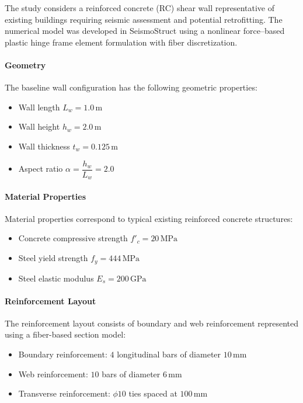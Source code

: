 \documentclass[fleqn,10pt]{wlscirep}
\begin{document}
The study considers a reinforced concrete (RC) shear wall representative of existing buildings requiring seismic assessment and potential retrofitting. 
The numerical model was developed in SeismoStruct using a nonlinear force--based plastic hinge frame element formulation with fiber discretization.

\paragraph{Geometry}

The baseline wall configuration has the following geometric properties:

\begin{itemize}
\item Wall length $L_w = 1.0\,\text{m}$
\item Wall height $h_w = 2.0\,\text{m}$
\item Wall thickness $t_w = 0.125\,\text{m}$
\item Aspect ratio $\alpha = \dfrac{h_w}{L_w} = 2.0$
\end{itemize}

\paragraph{Material Properties}

Material properties correspond to typical existing reinforced concrete structures:

\begin{itemize}
\item Concrete compressive strength $f'_c = 20\,\text{MPa}$
\item Steel yield strength $f_y = 444\,\text{MPa}$
\item Steel elastic modulus $E_s = 200\,\text{GPa}$
\end{itemize}

\paragraph{Reinforcement Layout}

The reinforcement layout consists of boundary and web reinforcement represented using a fiber-based section model:

\begin{itemize}
\item Boundary reinforcement: $4$ longitudinal bars of diameter $10\,\text{mm}$
\item Web reinforcement: $10$ bars of diameter $6\,\text{mm}$
\item Transverse reinforcement: $\phi10$ ties spaced at $100\,\text{mm}$
\end{itemize}
\end{document}

